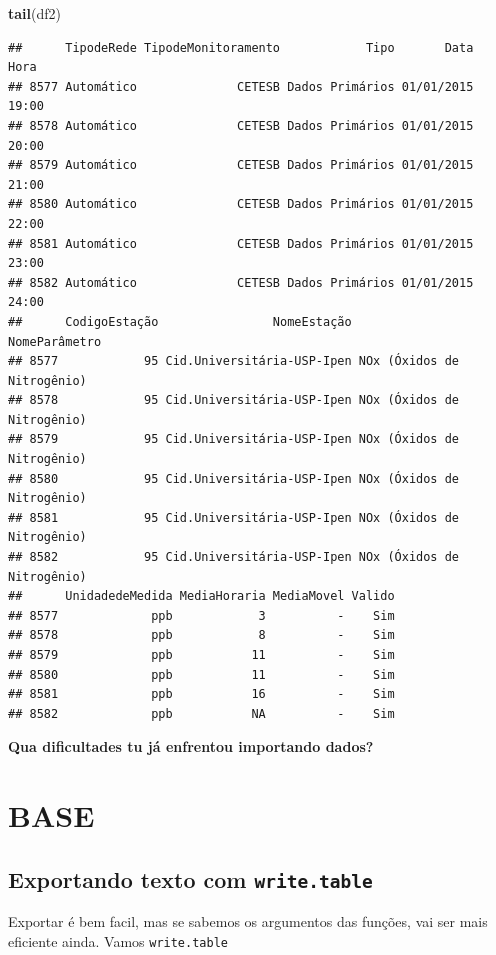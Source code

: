 \documentclass[]{book}
\newenvironment{Shaded}{\begin{snugshade}}{\end{snugshade}}
\newcommand{\KeywordTok}[1]{\textcolor[rgb]{0.13,0.29,0.53}{\textbf{#1}}}
\newcommand{\NormalTok}[1]{#1}
\theoremstyle{definition}
\theoremstyle{definition}
\theoremstyle{definition}
\theoremstyle{remark}
\begin{document}
\begin{Shaded}
\begin{Highlighting}[]
\KeywordTok{tail}\NormalTok{(df2)}
\end{Highlighting}
\end{Shaded}

\begin{verbatim}
##      TipodeRede TipodeMonitoramento            Tipo       Data  Hora
## 8577 Automático              CETESB Dados Primários 01/01/2015 19:00
## 8578 Automático              CETESB Dados Primários 01/01/2015 20:00
## 8579 Automático              CETESB Dados Primários 01/01/2015 21:00
## 8580 Automático              CETESB Dados Primários 01/01/2015 22:00
## 8581 Automático              CETESB Dados Primários 01/01/2015 23:00
## 8582 Automático              CETESB Dados Primários 01/01/2015 24:00
##      CodigoEstação                NomeEstação              NomeParâmetro
## 8577            95 Cid.Universitária-USP-Ipen NOx (Óxidos de Nitrogênio)
## 8578            95 Cid.Universitária-USP-Ipen NOx (Óxidos de Nitrogênio)
## 8579            95 Cid.Universitária-USP-Ipen NOx (Óxidos de Nitrogênio)
## 8580            95 Cid.Universitária-USP-Ipen NOx (Óxidos de Nitrogênio)
## 8581            95 Cid.Universitária-USP-Ipen NOx (Óxidos de Nitrogênio)
## 8582            95 Cid.Universitária-USP-Ipen NOx (Óxidos de Nitrogênio)
##      UnidadedeMedida MediaHoraria MediaMovel Valido
## 8577             ppb            3          -    Sim
## 8578             ppb            8          -    Sim
## 8579             ppb           11          -    Sim
## 8580             ppb           11          -    Sim
## 8581             ppb           16          -    Sim
## 8582             ppb           NA          -    Sim
\end{verbatim}

\textbf{Qua dificultades tu já enfrentou importando dados?}

\section{BASE}\label{base}

\subsection{\texorpdfstring{Exportando texto com
\texttt{write.table}}{Exportando texto com write.table}}\label{exportando-texto-com-write.table}

Exportar é bem facil, mas se sabemos os argumentos das funções, vai ser
mais eficiente ainda. Vamos \texttt{write.table}
\end{document}
